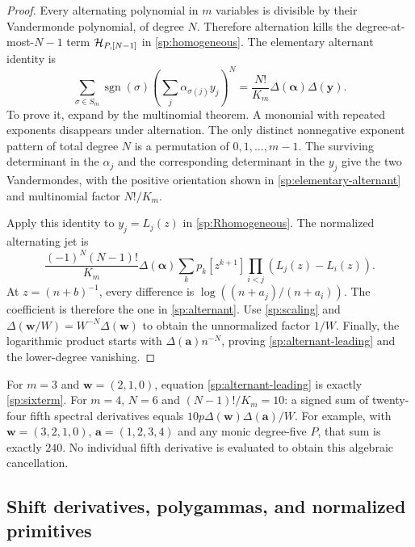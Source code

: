 \begin{proof}
Every alternating polynomial in $m$ variables is divisible by their
Vandermonde polynomial, of degree $N$. Therefore alternation kills
the degree-at-most-$N-1$ term $\mathcal H_{P,[N-1]}$ in
\eqref{sp:homogeneous}. The elementary alternant identity is
\begin{equation}\label{sp:elementary-alternant}
 \sum_{\sigma\in S_m}\operatorname{sgn}(\sigma)
       \left(\sum_j\alpha_{\sigma(j)}y_j\right)^N
   =\frac{N!}{K_m}\Delta(\boldsymbol\alpha)\Delta(\boldsymbol y).
\end{equation}
To prove it, expand by the multinomial theorem. A monomial with
repeated exponents disappears under alternation. The only distinct
nonnegative exponent pattern of total degree $N$ is a permutation
of $0,1,\ldots,m-1$. The surviving determinant in the $\alpha_j$
and the corresponding determinant in the $y_j$ give the two
Vandermondes, with the positive orientation shown in
\eqref{sp:elementary-alternant} and multinomial factor $N!/K_m$.

Apply this identity to $y_j=L_j(z)$ in
\eqref{sp:Rhomogeneous}. The normalized alternating jet is
\[
 \frac{(-1)^N(N-1)!}{K_m}\Delta(\boldsymbol\alpha)
           \sum_kp_k[z^{k+1}]\prod_{i<j}(L_j(z)-L_i(z)).
\]
At $z=(n+b)^{-1}$, every difference is
$\log((n+a_j)/(n+a_i))$. The coefficient is therefore the one
in \eqref{sp:alternant}. Use \eqref{sp:scaling} and
$\Delta(\boldsymbol w/W)=W^{-N}\Delta(\boldsymbol w)$ to obtain
the unnormalized factor $1/W$. Finally, the logarithmic product
starts with $\Delta(\boldsymbol a)n^{-N}$, proving
\eqref{sp:alternant-leading} and the lower-degree vanishing.
\end{proof}

For $m=3$ and $\boldsymbol w=(2,1,0)$, equation
\eqref{sp:alternant-leading} is exactly \eqref{sp:sixterm}.
For $m=4$, $N=6$ and $(N-1)!/K_m=10$: a signed sum of
twenty-four fifth spectral derivatives equals
$10p\Delta(\boldsymbol w)\Delta(\boldsymbol a)/W$.
For example, with $\boldsymbol w=(3,2,1,0)$,
$\boldsymbol a=(1,2,3,4)$ and any monic degree-five $P$, that
sum is exactly $240$. No individual fifth derivative is evaluated
to obtain this algebraic cancellation.

\subsection{Shift derivatives, polygammas, and normalized primitives}

